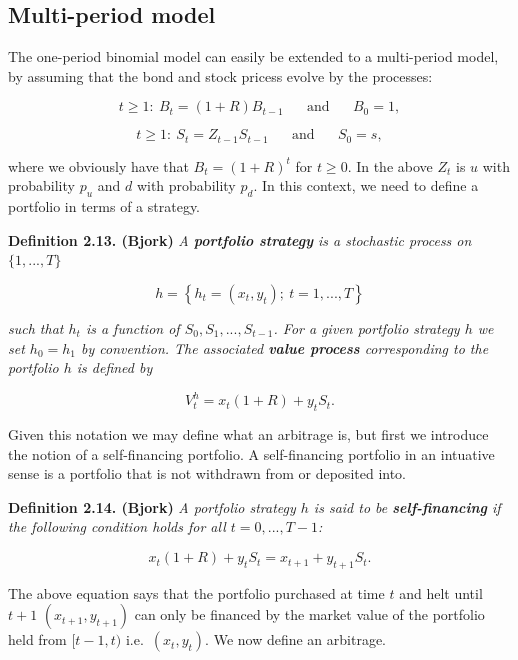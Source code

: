 \documentclass[a4paper,12pt,openany]{book}
\begin{document}
\hypertarget{multi-period-model}{%
\subsection{Multi-period model}\label{multi-period-model}}

The one-period binomial model can easily be extended to a multi-period model, by assuming that the bond and stock pricess evolve by the processes:

\[
t\ge1:\ B_t=(1+R)B_{t-1}\hspace{20pt}\text{and}\hspace{20pt}B_0=1,
\]

\[
t\ge1:\ S_t=Z_{t-1}S_{t-1}\hspace{20pt}\text{and}\hspace{20pt}S_0=s,
\]

where we obviously have that \(B_t=(1+R)^t\) for \(t\ge 0\). In the above \(Z_t\) is \(u\) with probability \(p_u\) and \(d\) with probability \(p_d\). In this context, we need to define a portfolio in terms of a strategy.

\textbf{Definition 2.13. (Bjork)} \emph{A \textbf{portfolio strategy} is a stochastic process on \(\{1,...,T\}\)}

\[
h=\left\{h_t=(x_t,y_t);\ t=1,...,T\right\}
\]

\emph{such that \(h_t\) is a function of \(S_0,S_1,...,S_{t-1}\). For a given portfolio strategy \(h\) we set \(h_0=h_1\) by convention. The associated \textbf{value process} corresponding to the portfolio \(h\) is defined by}

\[
V_t^h=x_t(1+R)+y_tS_t.
\]

Given this notation we may define what an arbitrage is, but first we introduce the notion of a self-financing portfolio. A self-financing portfolio in an intuative sense is a portfolio that is not withdrawn from or deposited into.

\textbf{Definition 2.14. (Bjork)} \emph{A portfolio strategy \(h\) is said to be \textbf{self-financing} if the following condition holds for all \(t=0,...,T-1\):}

\[
x_t(1+R)+y_tS_t=x_{t+1}+y_{t+1}S_t.
\]

The above equation says that the portfolio purchased at time \(t\) and helt until \(t+1\) \((x_{t+1},y_{t+1})\) can only be financed by the market value of the portfolio held from \([t-1,t)\) i.e.~\((x_{t},y_{t})\). We now define an arbitrage.
\end{document}
